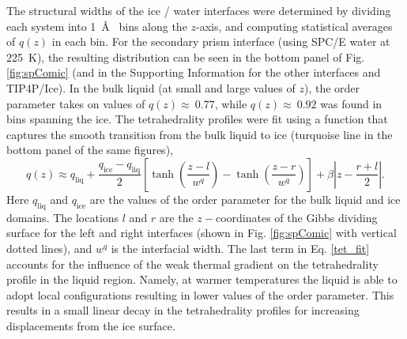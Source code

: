 The structural widths of the ice / water interfaces were determined by
dividing each system into 1~\AA~ bins along the $z$-axis, and
computing statistical averages of $q(z)$ in each bin. For the
secondary prism interface (using SPC/E water at 225~K), the resulting
distribution can be seen in the bottom panel of Fig. \ref{fig:spComic}
(and in the Supporting Information for the other interfaces and
TIP4P/Ice). In the bulk liquid (at small and large values of $z$), the
order parameter takes on values of $q(z) \approx~0.77$, while
$q(z) \approx~0.92$ was found in bins spanning the ice. The
tetrahedrality profiles were fit using a function that captures the
smooth transition from the bulk liquid to ice (turquoise line in the
bottom panel of the same figures),
\begin{equation}\label{tet_fit}
q(z) \approx
q_\mathrm{liq}+\frac{q_\mathrm{ice}-q_\mathrm{liq}}{2}\left[\tanh\left(\frac{z-l}{w^q}\right)-\tanh\left(\frac{z-r}{w^q}\right)\right]+\beta\left|z-\frac{r+l}{2}\right|.
\end{equation}
Here $q_\mathrm{liq}$ and $q_\mathrm{ice}$ are the values of the order
parameter for the bulk liquid and ice domains. The locations $l$ and
$r$ are the $z-$coordinates of the Gibbs dividing surface for the left
and right interfaces (shown in Fig. \ref{fig:spComic} with vertical
dotted lines), and $w^{q}$ is the interfacial width.  The last term in
Eq. \eqref{tet_fit} accounts for the influence of the weak thermal
gradient on the tetrahedrality profile in the liquid region. Namely,
at warmer temperatures the liquid is able to adopt local
configurations resulting in lower values of the order parameter. This
results in a small linear decay in the tetrahedrality profiles for
increasing displacements from the ice surface.

